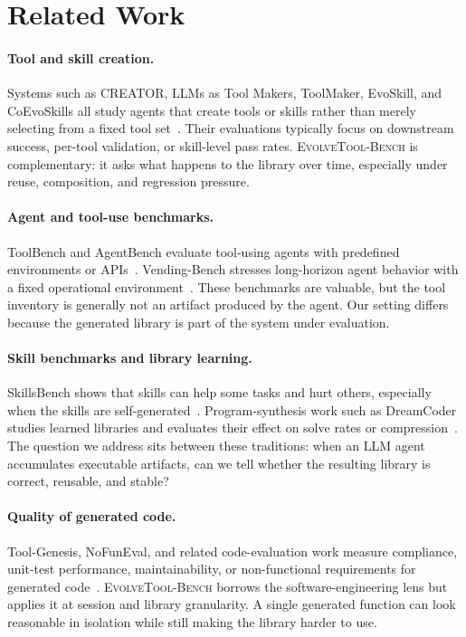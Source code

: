 \documentclass[sigconf,anonymous,natbib=false]{acmart}
\begin{document}
\section{Related Work}

\paragraph{Tool and skill creation.}
Systems such as CREATOR, LLMs as Tool Makers, ToolMaker, EvoSkill, and CoEvoSkills all study agents that create tools or skills rather than merely selecting from a fixed tool set~\cite{qian2023creator,cai2023latm,wolflein2025toolmaker,alzubi2026evoskill,zhang2026coevoskills}. Their evaluations typically focus on downstream success, per-tool validation, or skill-level pass rates. \textsc{EvolveTool-Bench} is complementary: it asks what happens to the library over time, especially under reuse, composition, and regression pressure.

\paragraph{Agent and tool-use benchmarks.}
ToolBench and AgentBench evaluate tool-using agents with predefined environments or APIs~\cite{qin2023toolbench,liu2024agentbench}. Vending-Bench stresses long-horizon agent behavior with a fixed operational environment~\cite{backlund2025vendingbench}. These benchmarks are valuable, but the tool inventory is generally not an artifact produced by the agent. Our setting differs because the generated library is part of the system under evaluation.

\paragraph{Skill benchmarks and library learning.}
SkillsBench shows that skills can help some tasks and hurt others, especially when the skills are self-generated~\cite{skillsbench2026}. Program-synthesis work such as DreamCoder studies learned libraries and evaluates their effect on solve rates or compression~\cite{ellis2021dreamcoder}. The question we address sits between these traditions: when an LLM agent accumulates executable artifacts, can we tell whether the resulting library is correct, reusable, and stable?

\paragraph{Quality of generated code.}
Tool-Genesis, NoFunEval, and related code-evaluation work measure compliance, unit-test performance, maintainability, or non-functional requirements for generated code~\cite{xia2026toolgenesis,singhal2024nofuneval}. \textsc{EvolveTool-Bench} borrows the software-engineering lens but applies it at session and library granularity. A single generated function can look reasonable in isolation while still making the library harder to use.
\end{document}

